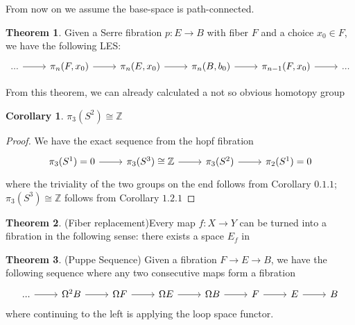 \documentclass{article}
\theoremstyle{definition}
\newtheorem{theorem}{Theorem}[section]
\theoremstyle{definition}
\theoremstyle{definition}
\theoremstyle{definition}
\theoremstyle{definition}
\theoremstyle{definition}
\newtheorem{corollary}{Corollary}[theorem]
\theoremstyle{definition}
\begin{document}
From now on we assume the base-space is path-connected.
\begin{tcolorbox}[colback=red!5!white,colframe=red!30!white]
\begin{theorem}
Given a Serre fibration $p:E\to B$ with fiber $F$ and a choice $x_0\in F$, we have the following LES:
\[
\begin{tikzcd}
...\arrow[r]&\pi_n(F,x_0)\arrow[r]&\pi_n(E,x_0)\arrow[r]&\pi_n(B,b_0)\arrow[r]&\pi_{n-1}(F,x_0)\arrow[r]&...
\end{tikzcd}
\]
\end{theorem}
\end{tcolorbox}
From this theorem, we can already calculated a not so obvious homotopy group
\begin{tcolorbox}[colback=green!5!white,colframe=green!30!white]
\begin{corollary}
$\pi_3(S^2)\cong \mathbb{Z}$
\end{corollary}
\end{tcolorbox}
\begin{proof}
    We have the exact sequence from the hopf fibration
    \[
    \begin{tikzcd}
    \pi_3(S^1)=0\arrow[r]&\pi_3(S^3)\cong \mathbb{Z}\arrow[r]&\pi_3(S^2)\arrow[r]&\pi_2(S^1)=0
    \end{tikzcd}
    \]
    where the triviality of the two groups on the end follows from Corollary $0.1.1$; $\pi_3(S^3)\cong \mathbb{Z}$ follows from Corollary $1.2.1$
\end{proof}
 

\begin{tcolorbox}[colback=red!5!white,colframe=red!30!white]
\begin{theorem}
(Fiber replacement)Every map $f: X\to Y$ can be turned into a fibration in the following sense: there exists a space $E_f$ in 
\end{theorem}
\end{tcolorbox}

\begin{tcolorbox}[colback=red!5!white,colframe=red!30!white]
\begin{theorem}
(Puppe Sequence) Given a fibration $F\to E\to B$, we have the following sequence where any two consecutive maps form a fibration
\[
\begin{tikzcd}
    ...\arrow[r]&\Omega^2B\arrow[r]&\Omega F\arrow[r]&\Omega E\arrow[r]&\Omega B\arrow[r]&F\arrow[r]&E\arrow[r]&B
\end{tikzcd}
\]
where continuing to the left is applying the loop space functor.
\end{theorem}
\end{tcolorbox}
\end{document}
